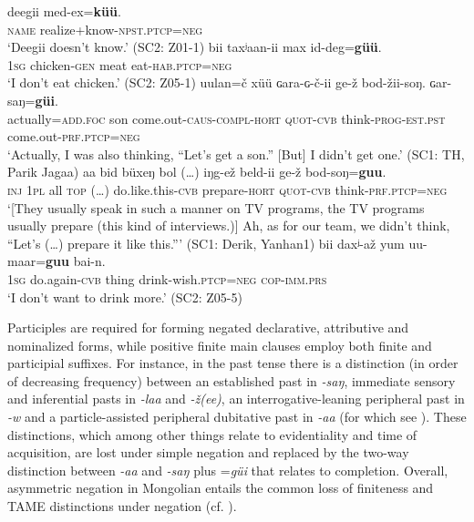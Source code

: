 \documentclass[output=paper,colorlinks,citecolor=brown,chinesefont]{langscibook}
\begin{document}
\ea\label{ex:kha:4}
    \gll deegii med-ex=\textbf{küü}. \\ 
         \textsc{name} realize+know-\textsc{npst.ptcp=neg} \\
    \glt ‘Deegii doesn’t know.’ (SC2: Z01-1)
\z 
\ea\label{ex:kha:5}
    \gll bii taxʲaan{}-ii max id{}-deg=\textbf{güü}. \\ 
         \textsc{1sg} chicken-\textsc{gen} meat eat-\textsc{hab.ptcp=neg} \\
    \glt ‘I don’t eat chicken.’ (SC2: Z05-1)
\z 
\ea\label{ex:kha:6}
    \gll uulan=č xüü ɢara-ɢ{}-č-ii ge-ž bod-žii-soŋ. ɢar-saŋ=\textbf{güi}.\\ 
         actually=\textsc{add.foc} son come.out-\textsc{caus-compl-hort} \textsc{quot-cvb} think-\textsc{prog-est.pst} come.out-\textsc{prf.ptcp=neg} \\
    \glt ‘Actually, I was also thinking, “Let’s get a son.” [But] I didn’t get one.’ (SC1: TH, Parik Jagaa)
\z 
\ea\label{ex:kha:7}
    \gll aa bid büxeŋ bol (…) iŋg-ež beld-ii ge-ž bod-soŋ=\textbf{guu}.\\ 
         \textsc{inj} \textsc{1pl} all \textsc{top} (…) do.like.this-\textsc{cvb} prepare-\textsc{hort} \textsc{quot-cvb} think-\textsc{prf.ptcp=neg} \\
    \glt ‘[They usually speak in such a manner on TV programs, the TV programs usually prepare (this kind of interviews.)] Ah, as for our team, we didn’t think, “Let’s (…) prepare it like this.”’ (SC1: Derik, Yanhan1)
\z 
\ea\label{ex:kha:8}
    \gll bii daxʲ-až yum uu-maar=\textbf{guu} bai-n. \\ 
         \textsc{1sg} do.again-\textsc{cvb} thing drink-wish.\textsc{ptcp=neg} \textsc{cop-imm.prs} \\
    \glt ‘I don’t want to drink more.’ (SC2: Z05-5)
\z 

Participles are required for forming negated declarative, attributive and nominalized forms, while positive finite main clauses employ both finite and participial suffixes. For instance, in the past tense there is a distinction (in order of decreasing frequency) between an established past in \textit{-saŋ}, immediate sensory and inferential pasts in \textit{-laa} and \textit{-ž(ee)}, an interrogative-leaning peripheral past in \textit{-w} and a particle-assisted peripheral dubitative past in \textit{-aa} (for which see \citealt{Brosig2015Aspect, Brosig2018, BrosigSkribnik2018}). These distinctions, which among other things relate to evidentiality and time of acquisition, are lost under simple negation and replaced by the two-way distinction between \textit{-aa} and \textit{-saŋ} plus =\textit{güi} that relates to completion. Overall, asymmetric negation in Mongolian entails the common loss of finiteness and TAME distinctions under negation (cf. \citealt{Miestamo2005}).
\end{document}
